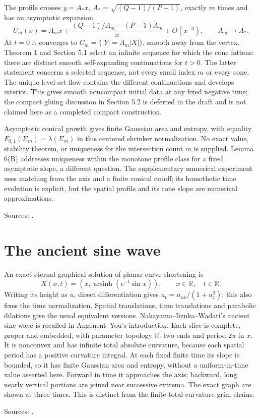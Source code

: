 \begin{example}
The profile crosses $y=A_*x$, $A_*=\sqrt{(Q-1)/(P-1)}$, exactly $m$ times and has an asymptotic expansion
\[
 U_m(x)=A_mx+\frac{(Q-1)/A_m-(P-1)A_m}{x}+O(x^{-3}),
 \qquad A_m\longrightarrow A_*.
\]
At $t=0$ it converges to $C_m=\{|Y|=A_m|X|\}$, smooth away from the vertex. Theorem 1 and Section 5.1 select an infinite sequence for which the cone fattens: there are distinct smooth self-expanding continuations for $t>0$. The latter statement concerns a selected sequence, not every small index $m$ or every cone. The unique level-set flow contains the different continuations and develops interior. This gives smooth noncompact initial data at any fixed negative time; the compact gluing discussion in Section 5.2 is deferred in the draft and is not claimed here as a completed compact construction.

Asymptotic conical growth gives finite Gaussian area and entropy, with equality $F_{0,1}(\Sigma_m)=\lambda(\Sigma_m)$ in this centered shrinker normalization. No exact value, stability theorem, or uniqueness for the intersection count $m$ is supplied. Lemma 6(B) addresses uniqueness within the monotone profile class for a fixed asymptotic slope, a different question. The supplementary numerical experiment uses matching from the axis and a finite conical cutoff; its homothetic time evolution is explicit, but the spatial profile and its cone slope are numerical approximations.

\par Sources: \cite{CatNeto2026a,CatAIV2002}.
\end{example}

\chapter{The ancient sine wave}\label{sec:catalogue-ancient-sine-wave}
\begin{example}\label{ex:catalogue-ancient-sine-wave}
An exact eternal graphical solution of planar curve shortening is
\[
 X(x,t)=(x,\operatorname{arsinh}(e^{-t}\sin x)),\qquad x\in\mathbb R,\quad t\in\mathbb R.
\]
Writing its height as $u$, direct differentiation gives $u_t=u_{xx}/(1+u_x^2)$; this also fixes the time normalization. Spatial translations, time translations and parabolic dilations give the usual equivalent versions. Nakayama--Iizuka--Wadati's ancient sine wave is recalled in Angenent--You's introduction.
Each slice is complete, proper and embedded, with parameter topology $\mathbb R$, two ends and period $2\pi$ in $x$. It is nonconvex and has infinite total absolute curvature, because each spatial period has a positive curvature integral. At each fixed finite time its slope is bounded, so it has finite Gaussian area and entropy, without a uniform-in-time value asserted here. Forward in time it approaches the axis; backward, long nearly vertical portions are joined near successive extrema. The exact graph are shown at three times. This is distinct from the finite-total-curvature grim chains.
\par Sources: \cite{CatNakayamaIizukaWadati1994,CatAY18}.
\end{example}


